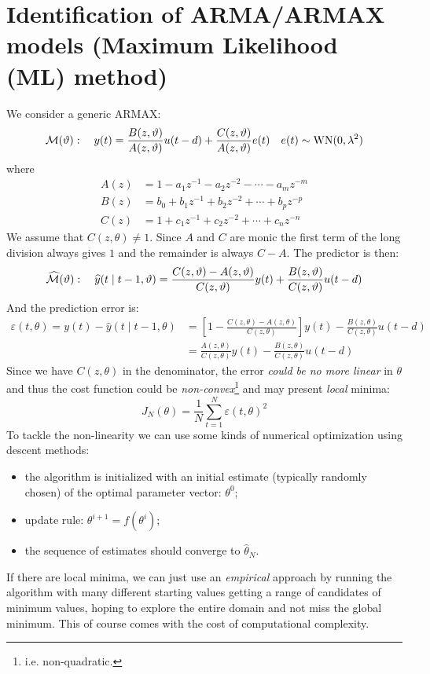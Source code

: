 
\section{Identification of ARMA/ARMAX models (Maximum Likelihood (ML) method)}

We consider a generic ARMAX:
\[
	\mathcal{M}(\vartheta ): \quad y(t)=\frac{B(z,\vartheta )}{A(z,\vartheta)} u(t-d)+\frac{C(z,\vartheta )}{A(z,\vartheta)}e(t)\quad e(t)\sim \operatorname{WN}(0,\lambda^2)
\]
where
\begin{align*}
	A(z)&=1-a_{1} z^{-1}-a_{2} z^{-2}-\cdots-a_{m} z^{-m} \\
	B(z)&=b_{0}+b_{1} z^{-1}+b_{2} z^{-2}+\cdots+b_{p} z^{-p} \\
	C(z)&=1+c_{1} z^{-1}+c_{2} z^{-2}+\cdots+c_{n} z^{-n}
\end{align*}
We assume that $C(z,\theta)\neq 1$. Since $A$ and $C$ are monic the first term of the long division always gives $1$ and the remainder is always $C-A$. The predictor is then:
\[
	\widehat{\mathcal{M}}(\vartheta): \quad \widehat{y}(t \mid t-1, \vartheta)=\frac{C(z,\vartheta)-A(z,\vartheta)}{C(z,\vartheta)} y(t)+\frac{B(z,\vartheta)}{C(z,\vartheta)} u(t-d)
\]
And the prediction error is:
\begin{align*}
	\varepsilon(t, \theta)=y(t)-\hat{y}(t \mid t-1, \theta)&=\left[1-\frac{C(z,\theta)-A(z,\theta)}{C(z,\theta)}\right] y(t)-\frac{B(z,\theta)}{C(z,\theta)} u(t-d)\\
	&=\frac{A(z,\theta)}{C(z,\theta)} y(t)-\frac{B(z,\theta)}{C(z,\theta)} u(t-d)
\end{align*}
Since we have $C(z,\theta)$ in the denominator, the error \emph{could be no more linear} in $\theta$ and thus the cost function could be \emph{non-convex}\footnote{i.e. non-quadratic.} and may present \emph{local} minima:
\[
	J_{N}(\theta)=\frac{1}{N} \sum_{t=1}^{N} \varepsilon(t, \theta)^{2}
\]
To tackle the non-linearity we can use some kinds of numerical optimization using descent methods:
\begin{itemize}
	\item the algorithm is initialized with an initial estimate (typically randomly chosen) of the optimal parameter vector: $\theta^{0}$;
	\item update rule: $\theta^{i+1} = f (\theta^{i})$;
	\item the sequence of estimates should converge to $\hat\theta_{N}$.
\end{itemize}
If there are local minima, we can just use an \emph{empirical} approach by running the algorithm with many different starting values getting a range of candidates of minimum values, hoping to explore the entire domain and not miss the global minimum. This of course comes with the cost of computational complexity.


